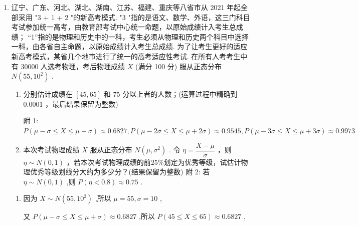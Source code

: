 \begin{enumerate}
\begin{enumerate}
\begin{jieda}
\begin{enumerate}
                且 $P\left( {\mu  - \sigma  \leq  X \leq  \mu  + \sigma }\right)  \approx  {0.6827}$ ,
                
                $\therefore P\left( {{80} \leq  X \leq  {110}}\right)  \approx  {0.6827}$ ,
                
                $\therefore$ 考试成绩位于区间 $\left\lbrack  {{80},{110}}\right\rbrack$ 内的考生人数为 ${3000} \times  {0.6827} \approx  {2048}$ (人).
            \end{enumerate}
        \end{jieda}
        
        \item 辽宁、广东、河北、湖北、湖南、江苏、福建、重庆等八省市从 2021 年起全部采用 "3 + 1 + 2 "的新高考模式. "3 "指的是语文、数学、外语，这三门科目考试参加统一高考，由教育部考试中心统一命题，以原始成绩计入考生总成绩； “1”指的是物理和历史中的一科，考生必须从物理和历史两个科目中选择一科，由各省自主命题，以原始成绩计入考生总成绩. 为了让考生更好的适应新高考模式，某省几个地市进行了统一的高考适应性考试. 在所有人考考生中有 30000 人选考物理，考后物理成绩 $X$ (满分 100 分) 服从正态分布 $N\left( {{55},{10}^{2}}\right)$ .
        \begin{enumerate}
            \item 分别估计成绩在 $\left\lbrack  {{45},{65}}\right\rbrack$ 和 75 分以上者的人数；(运算过程中精确到 0.0001 ，最后结果保留为整数)

            附 1: $P\left( {\mu  - \sigma  \leq  X \leq  \mu  + \sigma }\right)  \approx  {0.6827},P\left( {\mu  - {2\sigma } \leq  X \leq  \mu  + {2\sigma }}\right)  \approx  {0.9545},P(\mu  - {3\sigma } \leq  X \leq  \mu  +  {3\sigma }) \approx  {0.9973}$
            \item 本次考试物理成绩 $X$ 服从正态分布 $N\left( {\mu ,{\sigma }^{2}}\right)$ . 令 $\eta  = \dfrac{X - \mu }{\sigma }$ ，则 $\eta  \sim  N\left( {0,1}\right)$ ，若本次考试物理成绩的前$25\%$划定为优秀等级，试估计物理优秀等级划线分大约为多少分？(结果保留为整数)
            附 2: 若 $\eta  \sim  N\left( {0,1}\right)$ ,则 $P\left( {\eta  < {0.8}}\right)  \approx  {0.75}$ .
        \end{enumerate}
        \begin{jieda}
            \begin{enumerate}
                \item 因为 $X \sim  N\left( {{55},{10}^{2}}\right)$ ,所以 $\mu  = {55},\sigma  = {10}$ ,
                
                又 $P\left( {\mu  - \sigma  \leq  X \leq  \mu  + \sigma }\right)  \approx  {0.6827}$ ,所以 $P\left( {{45} \leq  X \leq  {65}}\right)  \approx  {0.6827}$ ,
                

\end{enumerate}
\end{jieda}
\end{enumerate}
\end{enumerate}
